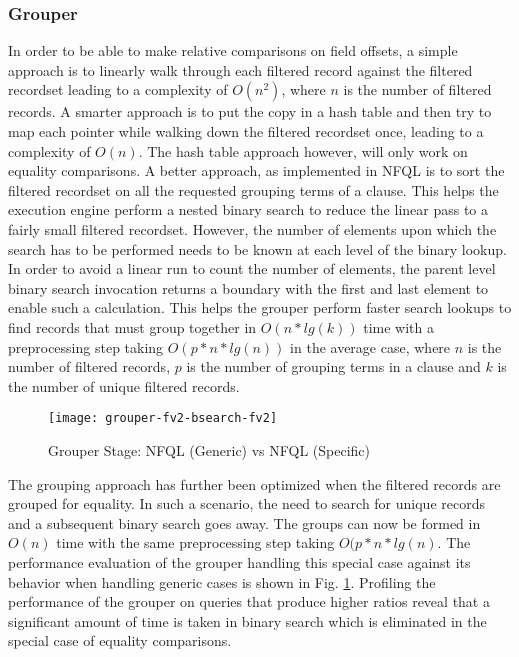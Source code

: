 \subsubsection{Grouper}

In order to be able to make relative comparisons on field offsets, a simple
approach is to linearly walk through each filtered record against the filtered
recordset leading to a complexity of $O(n^2)$, where $n$ is the number of
filtered records. A smarter approach is to put the copy in a hash table and
then try to map each pointer while walking down the filtered recordset once,
leading to a complexity of $O(n)$. The hash table approach however, will only
work on equality comparisons. A better approach, as implemented in \ac{NFQL}
is to sort the filtered recordset on all the requested grouping terms of a
clause. This helps the execution engine perform a nested binary search to
reduce the linear pass to a fairly small filtered recordset. However, the
number of elements upon which the search has to be performed needs to be known
at each level of the binary lookup. In order to avoid a linear run to count
the number of elements, the parent level binary search invocation returns a
boundary with the first and last element to enable such a calculation. This
helps the grouper perform faster search lookups to find records that must
group together in $O(n*lg(k))$ time with a preprocessing step taking
$O(p*n*lg(n))$ in the average case, where $n$ is the number of filtered
records, $p$ is the number of grouping terms in a clause and $k$ is the number
of unique filtered records.

\begin{figure}[h!]
  \begin{center}
    \texttt{[image: grouper-fv2-bsearch-fv2]}
    \caption{Grouper Stage: NFQL (Generic) vs NFQL (Specific)}
    \label{fig:fv1-fv2-grouper}
  \end{center}
\end{figure}

The grouping approach has further been optimized when the filtered records are
grouped for equality. In such a scenario, the need to search for unique
records and a  subsequent binary search goes away.  The groups can now be
formed in $O(n)$ time with the same preprocessing step taking $O(p*n*lg(n)$.
The performance evaluation of the grouper handling this special case against
its behavior when handling generic cases is shown in Fig.
\ref{fig:fv1-fv2-grouper}. Profiling the performance of the grouper on queries
that produce higher ratios reveal that a significant amount of time is taken
in binary search which is eliminated in the special case of equality
comparisons.

